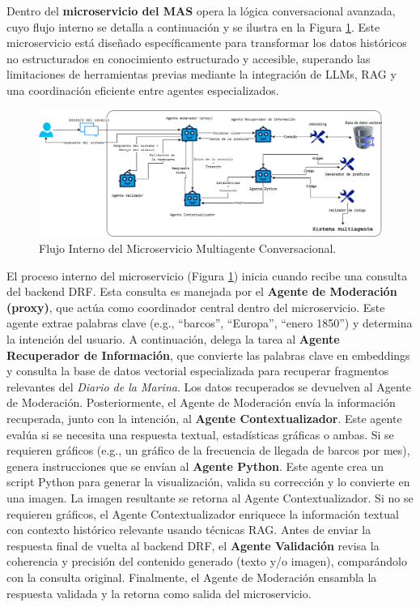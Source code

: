 Dentro del \textbf{microservicio del MAS} opera la lógica conversacional avanzada, cuyo flujo interno se detalla a continuación y se ilustra en la Figura \ref{fig:flujo_mas_interno}. Este microservicio está diseñado específicamente para transformar los datos históricos no estructurados en conocimiento estructurado y accesible, superando las limitaciones de herramientas previas mediante la integración de LLMs, RAG y una coordinación eficiente entre agentes especializados.

\begin{figure}[htbp] 
	\centering
	\includegraphics[width=1\textwidth]{images/mas.png} 
	\caption{Flujo Interno del Microservicio Multiagente Conversacional.}
	\label{fig:flujo_mas_interno} %
\end{figure}

El proceso interno del microservicio (Figura \ref{fig:flujo_mas_interno}) inicia cuando recibe una consulta del backend DRF. Esta consulta es manejada por el \textbf{Agente de Moderación (proxy)}, que actúa como coordinador central dentro del microservicio. Este agente extrae palabras clave (e.g., “barcos”, “Europa”, “enero 1850”) y determina la intención del usuario. A continuación, delega la tarea al \textbf{Agente Recuperador de Información}, que convierte las palabras clave en embeddings y consulta la base de datos vectorial especializada para recuperar fragmentos relevantes del \textit{Diario de la Marina}. Los datos recuperados se devuelven al Agente de Moderación. Posteriormente, el Agente de Moderación envía la información recuperada, junto con la intención, al \textbf{Agente Contextualizador}. Este agente evalúa si se necesita una respuesta textual, estadísticas gráficas o ambas. Si se requieren gráficos (e.g., un gráfico de la frecuencia de llegada de barcos por mes), genera instrucciones que se envían al \textbf{Agente Python}. Este agente crea un script Python para generar la visualización, valida su corrección y lo convierte en una imagen. La imagen resultante se retorna al Agente Contextualizador. Si no se requieren gráficos, el Agente Contextualizador enriquece la información textual con contexto histórico relevante usando técnicas RAG. Antes de enviar la respuesta final de vuelta al backend DRF, el \textbf{Agente Validación} revisa la coherencia y precisión del contenido generado (texto y/o imagen), comparándolo con la consulta original. Finalmente, el Agente de Moderación ensambla la respuesta validada y la retorna como salida del microservicio. 

